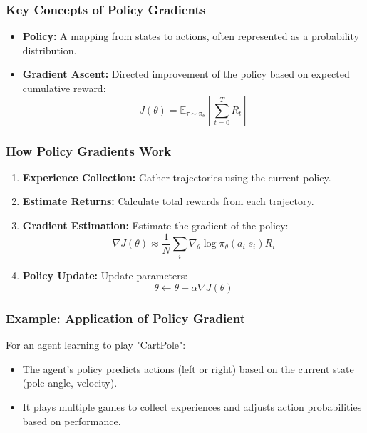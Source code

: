 \documentclass[aspectratio=169]{beamer}
\begin{document}
\begin{frame}[fragile]
    \frametitle{Key Concepts of Policy Gradients}
    
    \begin{itemize}
        \item \textbf{Policy:} A mapping from states to actions, often represented as a probability distribution.
        \item \textbf{Gradient Ascent:} Directed improvement of the policy based on expected cumulative reward:
            \begin{equation}
            J(\theta) = \mathbb{E}_{\tau \sim \pi_{\theta}} \left[ \sum_{t=0}^{T} R_t \right]
            \end{equation}
        \end{itemize}
        
\end{frame}

\begin{frame}[fragile]
    \frametitle{How Policy Gradients Work}
    
    \begin{enumerate}
        \item \textbf{Experience Collection:} Gather trajectories using the current policy.
        \item \textbf{Estimate Returns:} Calculate total rewards from each trajectory.
        \item \textbf{Gradient Estimation:} Estimate the gradient of the policy:
            \begin{equation}
            \nabla J(\theta) \approx \frac{1}{N} \sum_{i} \nabla_{\theta} \log \pi_{\theta}(a_i | s_i) R_i
            \end{equation}
        \item \textbf{Policy Update:} Update parameters:
            \begin{equation}
            \theta \leftarrow \theta + \alpha \nabla J(\theta)
            \end{equation}
    \end{enumerate}

\end{frame}

\begin{frame}[fragile]
    \frametitle{Example: Application of Policy Gradient}
    
    For an agent learning to play "CartPole":
    \begin{itemize}
        \item The agent's policy predicts actions (left or right) based on the current state (pole angle, velocity).
        \item It plays multiple games to collect experiences and adjusts action probabilities based on performance.
    \end{itemize}
    
\end{frame}
\end{document}

